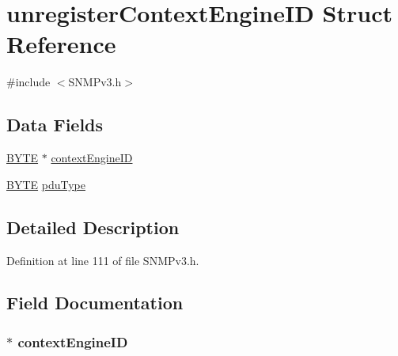 \hypertarget{structunregister_context_engine_i_d}{}\section{unregister\+Context\+Engine\+I\+D Struct Reference}
\label{structunregister_context_engine_i_d}


{\ttfamily \#include $<$S\+N\+M\+Pv3.\+h$>$}

\subsection*{Data Fields}
\begin{DoxyCompactItemize}
\item 
\hyperlink{_generic_type_defs_8h_a4ae1dab0fb4b072a66584546209e7d58}{B\+Y\+T\+E} $\ast$ \hyperlink{structunregister_context_engine_i_d_aa75baf2d001f5d5ac415eed279fd6e85}{context\+Engine\+I\+D}
\item 
\hyperlink{_generic_type_defs_8h_a4ae1dab0fb4b072a66584546209e7d58}{B\+Y\+T\+E} \hyperlink{structunregister_context_engine_i_d_ad106adfabb3dc56cdc2d52727d9771c5}{pdu\+Type}
\end{DoxyCompactItemize}


\subsection{Detailed Description}


Definition at line 111 of file S\+N\+M\+Pv3.\+h.



\subsection{Field Documentation}
\hypertarget{structunregister_context_engine_i_d_aa75baf2d001f5d5ac415eed279fd6e85}{}
\subsubsection[{context\+Engine\+I\+D}]{$\ast$ context\+Engine\+I\+D}\label{structunregister_context_engine_i_d_aa75baf2d001f5d5ac415eed279fd6e85}


